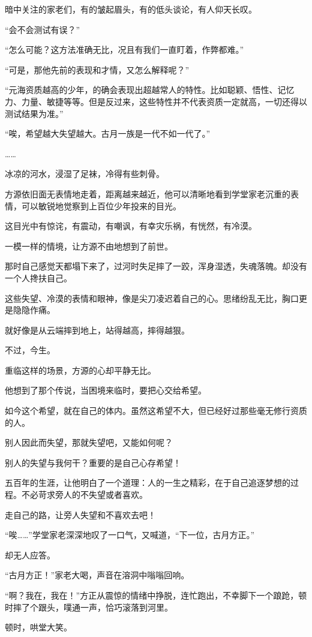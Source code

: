 \begin{this_body}
暗中关注的家老们，有的皱起眉头，有的低头谈论，有人仰天长叹。

“会不会测试有误？”

“怎么可能？这方法准确无比，况且有我们一直盯着，作弊都难。”

“可是，那他先前的表现和才情，又怎么解释呢？”

“元海资质越高的少年，的确会表现出超越常人的特性。比如聪颖、悟性、记忆力、力量、敏捷等等。但是反过来，这些特性并不代表资质一定就高，一切还得以测试结果为准。”

“唉，希望越大失望越大。古月一族是一代不如一代了。”

……

冰凉的河水，浸湿了足袜，冷得有些刺骨。

方源依旧面无表情地走着，距离越来越近，他可以清晰地看到学堂家老沉重的表情，可以敏锐地觉察到上百位少年投来的目光。

这目光中有惊诧，有震动，有嘲讽，有幸灾乐祸，有恍然，有冷漠。

一模一样的情境，让方源不由地想到了前世。

那时自己感觉天都塌下来了，过河时失足摔了一跤，浑身湿透，失魂落魄。却没有一个人搀扶自己。

这些失望、冷漠的表情和眼神，像是尖刀凌迟着自己的心。思绪纷乱无比，胸口更是隐隐作痛。

就好像是从云端摔到地上，站得越高，摔得越狠。

不过，今生。

重临这样的场景，方源的心却平静无比。

他想到了那个传说，当困境来临时，要把心交给希望。

如今这个希望，就在自己的体内。虽然这希望不大，但已经好过那些毫无修行资质的人。

别人因此而失望，那就失望吧，又能如何呢？

别人的失望与我何干？重要的是自己心存希望！

五百年的生涯，让他明白了一个道理：人的一生之精彩，在于自己追逐梦想的过程。不必苛求旁人的不失望或者喜欢。

走自己的路，让旁人失望和不喜欢去吧！

“唉……”学堂家老深深地叹了一口气，又喊道，“下一位，古月方正。”

却无人应答。

“古月方正！”家老大喝，声音在溶洞中嗡嗡回响。

“啊？我在，我在！”方正从震惊的情绪中挣脱，连忙跑出，不幸脚下一个踉跄，顿时摔了个跟头，噗通一声，恰巧滚落到河里。

顿时，哄堂大笑。


\end{this_body}
